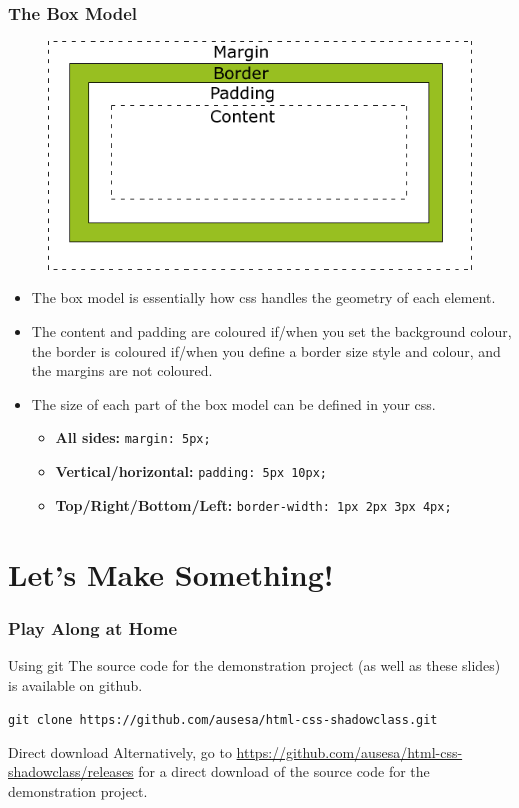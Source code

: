 \documentclass{beamer}
\begin{document}
\begin{frame}
\frametitle{The Box Model}

\begin{figure}
\includegraphics[width=0.5\linewidth]{img/box-model.png}
\end{figure}

\begin{itemize}
\item The box model is essentially how css handles the geometry of each element.
\item The content and padding are coloured if/when you set the background colour, the border is coloured if/when you define a border size style and colour, and the margins are not coloured.
\item The size of each part of the box model can be defined in your css.
\begin{itemize}
\item \textbf{All sides:} \texttt{margin: 5px;}
\item \textbf{Vertical/horizontal:} \texttt{padding: 5px 10px;}
\item \textbf{Top/Right/Bottom/Left:} \texttt{border-width: 1px 2px 3px 4px;}
\end{itemize}
\end{itemize}
\end{frame}

\section{Let's Make Something!}

\begin{frame}
\frametitle{Play Along at Home}

\begin{block}{Using git}
The source code for the demonstration project (as well as these slides) is available on github.

\texttt{git clone https://github.com/ausesa/html-css-shadowclass.git}
\end{block}

\begin{block}{Direct download}
Alternatively, go to \href{https://github.com/ausesa/html-css-shadowclass/releases}{https://github.com/ausesa/html-css-shadowclass/releases} for a direct download of the source code for the demonstration project.
\end{block}

\end{frame}

\end{document}

